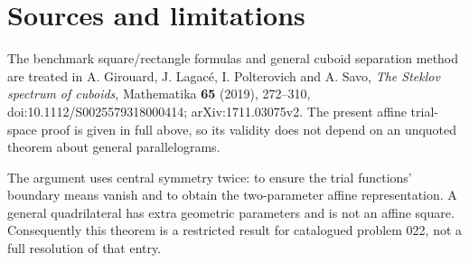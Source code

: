 \documentclass[11pt,a4paper]{article}
\begin{document}
\hypertarget{022-sources-and-limitations}{%
\section{Sources and limitations}\label{022-sources-and-limitations}}

The benchmark square/rectangle formulas and general cuboid separation
method are treated in A. Girouard, J. Lagacé, I. Polterovich and A.
Savo, \emph{The Steklov spectrum of cuboids}, Mathematika \textbf{65}
(2019), 272--310, doi:10.1112/S0025579318000414; arXiv:1711.03075v2. The
present affine trial-space proof is given in full above, so its validity
does not depend on an unquoted theorem about general parallelograms.

The argument uses central symmetry twice: to ensure the trial functions'
boundary means vanish and to obtain the two-parameter affine
representation. A general quadrilateral has extra geometric parameters
and is not an affine square. Consequently this theorem is a restricted
result for catalogued problem 022, not a full resolution of that entry.
\end{document}
